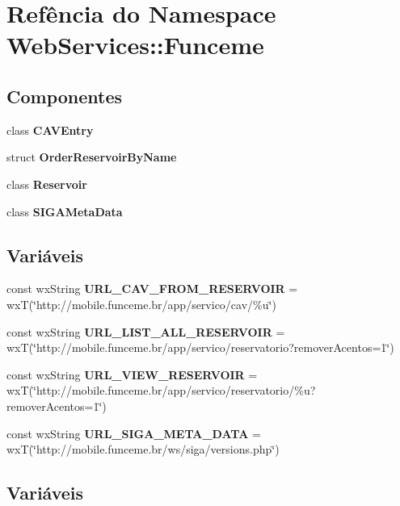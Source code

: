 \section{Refência do Namespace Web\+Services\+:\+:Funceme}
\label{namespace_web_services_1_1_funceme}
\subsection*{Componentes}
\begin{DoxyCompactItemize}
\item 
class {\bf C\+A\+V\+Entry}
\item 
struct {\bf Order\+Reservoir\+By\+Name}
\item 
class {\bf Reservoir}
\item 
class {\bf S\+I\+G\+A\+Meta\+Data}
\end{DoxyCompactItemize}
\subsection*{Variáveis}
\begin{DoxyCompactItemize}
\item 
const wx\+String {\bf U\+R\+L\+\_\+\+C\+A\+V\+\_\+\+F\+R\+O\+M\+\_\+\+R\+E\+S\+E\+R\+V\+O\+IR} = wxT(\char`\"{}http\+://mobile.\+funceme.\+br/app/servico/cav/\%u\char`\"{})
\item 
const wx\+String {\bf U\+R\+L\+\_\+\+L\+I\+S\+T\+\_\+\+A\+L\+L\+\_\+\+R\+E\+S\+E\+R\+V\+O\+IR} = wxT(\char`\"{}http\+://mobile.\+funceme.\+br/app/servico/reservatorio?remover\+Acentos=1\char`\"{})
\item 
const wx\+String {\bf U\+R\+L\+\_\+\+V\+I\+E\+W\+\_\+\+R\+E\+S\+E\+R\+V\+O\+IR} = wxT(\char`\"{}http\+://mobile.\+funceme.\+br/app/servico/reservatorio/\%u?remover\+Acentos=1\char`\"{})
\item 
const wx\+String {\bf U\+R\+L\+\_\+\+S\+I\+G\+A\+\_\+\+M\+E\+T\+A\+\_\+\+D\+A\+TA} = wxT(\char`\"{}http\+://mobile.\+funceme.\+br/ws/siga/versions.\+php\char`\"{})
\end{DoxyCompactItemize}


\subsection{Variáveis}
